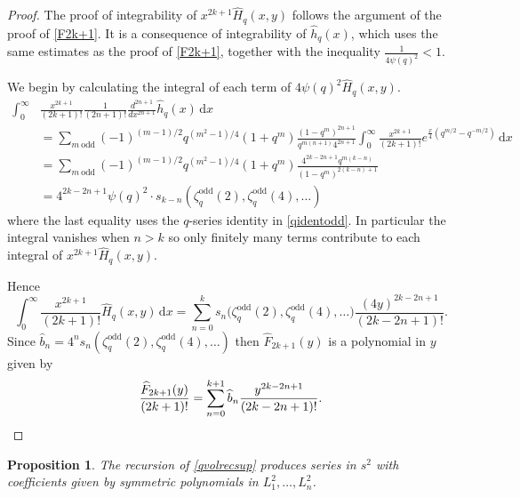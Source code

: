 \documentclass[a4paper]{article}
\theoremstyle{plain}
\newtheorem{proposition}[theorem]{Proposition}
\theoremstyle{definition}
\newcommand{\dd}{\mathrm{d}}
\begin{document}
\begin{proof}
The proof of integrability of $x^{2k+1} \widehat{H}_q(x,y)$ follows the argument of the proof of \cref{F2k+1}. It is a consequence of integrability of $\widehat{h}_q(x)$, which uses the same estimates as the proof of \cref{F2k+1}, together with the inequality $\frac{1}{4\psi(q)^2} < 1$.

We begin by calculating the integral of each term of $4\psi(q)^2\widehat{H}_q(x,y)$.
\begin{align*}
 \int_0^\infty &\!\! \frac{x^{2k+1}}{(2k+1)!} \frac{1}{(2n+1)!}\frac{d^{2n+1}}{dx^{2n+1}}\widehat{h}_q(x) \, \dd x \\
 &= \sum_{m~\mathrm{odd}}(-1)^{(m-1)/2} q^{(m^2-1)/4} (1+q^m)\frac{(1-q^m)^{2n+1}}{q^{m(n+1)}4^{2n+1}}\int_0^\infty \!\! \frac{x^{2k+1}}{(2k+1)!}e^{\frac{x}{4}(q^{m/2}-q^{-m/2})} \, \dd x \\
 &=\sum_{m~\mathrm{odd}}(-1)^{(m-1)/2} q^{(m^2-1)/4} (1+q^m)\frac{4^{2k-2n+1}q^{m(k-n)}}{(1-q^m)^{2(k-n)+1}}\\
 &=4^{2k-2n+1}\psi(q)^2 \cdot s_{k-n}(\zeta^{\mathrm{odd}}_q(2), \zeta^{\mathrm{odd}}_q(4), \ldots) 
\end{align*}
where the last equality uses the $q$-series identity in \cref{qidentodd}.  In particular the integral vanishes when $n>k$ so only finitely many terms contribute to each integral of $x^{2k+1}\widehat{H}_q(x,y)$.

Hence
\[
\int_0^\infty \!\! \frac{x^{2k+1}}{(2k+1)!}\widehat{H}_q(x,y) \, \dd x =\sum_{n=0}^{k} s_n \big( \zeta^{\mathrm{odd}}_q(2), \zeta^{\mathrm{odd}}_q(4), \ldots \big)\frac{(4y)^{2k-2n+1}}{(2k-2n+1)!}.
\]
Since $\widehat{b}_n=4^ns_n(\zeta^{\mathrm{odd}}_q(2), \zeta^{\mathrm{odd}}_q(4), \ldots)$ then $\widehat{F}_{2k+1}(y)$ is a polynomial in $y$ given by
\[
\frac{\widehat{F}_{2k+1}(y)}{(2k+1)!}=\sum_{n=0}^{k+1} \widehat{b}_n \frac{y^{2k-2n+1}}{(2k-2n+1)!}. \qedhere
\]
\end{proof}


\begin{proposition} \label{symsup}
The recursion of \cref{qvolrecsup} produces series in $s^2$ with coefficients given by symmetric polynomials in $L_1^2, \ldots, L_n^2$.
\end{proposition}
\end{document}
